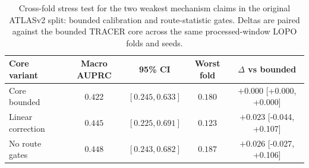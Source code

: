 \begin{table}[t]
\centering
\small
\setlength{\tabcolsep}{5pt}
\caption{Cross-fold stress test for the two weakest mechanism claims in the original ATLASv2 split: bounded calibration and route-statistic gates. Deltas are paired against the bounded TRACER core across the same processed-window LOPO folds and seeds.}
\label{tab:atlasv2-lopo-core-ablation}
\begin{tabular}{lcccc}
\toprule
Core variant & Macro AUPRC & 95\% CI & Worst fold & $\Delta$ vs bounded \\
\midrule
Core bounded & $0.422$ & $[0.245, 0.633]$ & $0.180$ & $+0.000$ [+0.000, +0.000] \\
Linear correction & $0.445$ & $[0.225, 0.691]$ & $0.123$ & $+0.023$ [-0.044, +0.107] \\
No route gates & $\mathbf{0.448}$ & $[0.243, 0.682]$ & $0.187$ & $+0.026$ [-0.027, +0.106] \\
\bottomrule
\end{tabular}
\end{table}
